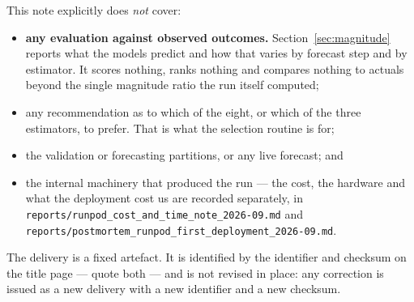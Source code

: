 \noindent This note explicitly does \emph{not} cover:
\begin{itemize}
    \item \textbf{any evaluation against observed outcomes.} Section~\ref{sec:magnitude} reports
          what the models predict and how that varies by forecast step and by estimator. It scores
          nothing, ranks nothing and compares nothing to actuals beyond the single magnitude ratio
          the run itself computed;
    \item any recommendation as to which of the eight, or which of the three estimators, to
          prefer. That is what the selection routine is for;
    \item the validation or forecasting partitions, or any live forecast; and
    \item the internal machinery that produced the run --- the cost, the hardware and what the
          deployment cost us are recorded separately, in
          \texttt{reports/runpod\_cost\_and\_time\_note\_2026-09.md} and
          \texttt{reports/postmortem\_runpod\_first\_deployment\_2026-09.md}.
\end{itemize}

\noindent The delivery is a fixed artefact. It is identified by the identifier and checksum on
the title page --- quote both --- and is not revised in place: any correction is issued as a new
delivery with a new identifier and a new checksum.
